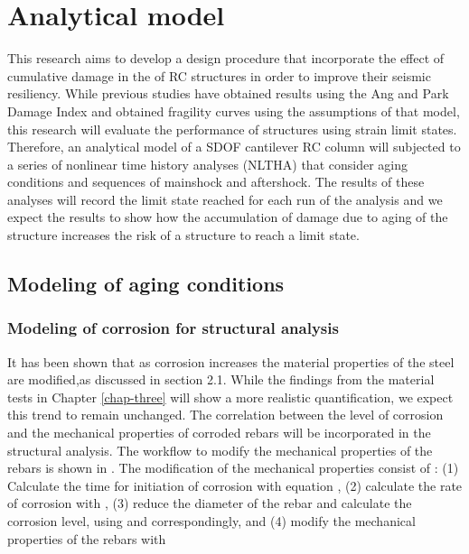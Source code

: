 \chapter{Analytical model}
\label{chap-four}
This research aims to develop a design procedure that incorporate the effect of cumulative damage in the of RC structures in order to improve their seismic resiliency. While previous studies have obtained results using the Ang and Park Damage Index and obtained fragility curves using the assumptions of that model, this research will evaluate the performance of structures using strain limit states. Therefore, an analytical model of a SDOF cantilever RC column will subjected to a series of nonlinear time history analyses (NLTHA) that consider aging conditions and sequences of mainshock and aftershock. The results of these analyses will record the limit state reached for each run of the analysis and we expect the results to show how the accumulation of damage due to aging of the structure increases the risk of a structure to reach a limit state. 

\section{Modeling of aging conditions}

\subsection{Modeling of corrosion for structural analysis}

It has been shown that as corrosion increases the material properties of the steel are modified,as discussed in section 2.1. While the findings from the material tests in Chapter \ref{chap-three} will show a more realistic quantification, we expect this trend to remain unchanged. The correlation between the level of corrosion and the mechanical properties of corroded rebars will be incorporated in the structural analysis. The workflow to modify the mechanical properties of the rebars is shown in . The modification of the mechanical properties consist of : (1) Calculate  the time for initiation of corrosion with equation , (2) calculate the rate of corrosion with , (3) reduce the diameter of the rebar and calculate the corrosion level, using  and  correspondingly, and (4) modify the mechanical properties of the rebars with 

